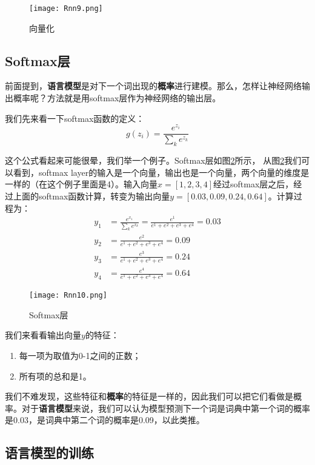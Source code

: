 \begin{figure}[!h]
	\centering
	\texttt{[image: Rnn9.png]}
	\caption{向量化}
	\label{fig:Rnn9}
\end{figure}

\subsection{Softmax层}\label{Rnn:11}

前面提到，\textbf{语言模型}是对下一个词出现的\textbf{概率}进行建模。那么，怎样让神经网络输出概率呢？方法就是用softmax层作为神经网络的输出层。

我们先来看一下softmax函数的定义：
\[
	g(z_i)=\frac{e^{z_i}}{\sum_{k}e^{z_k}}
\]

这个公式看起来可能很晕，我们举一个例子。Softmax层如图\ref{fig:Rnn10}所示，
从图\ref{fig:Rnn10}我们可以看到，softmax layer的输入是一个向量，输出也是一个向量，两个向量的维度是一样的（在这个例子里面是4）。输入向量$x=[1, 2, 3, 4]$经过softmax层之后，经过上面的softmax函数计算，转变为输出向量$y=[0.03, 0.09, 0.24, 0.64]$。计算过程为：
\begin{align*}
	y_1 & =\frac{e^{x_1}}{\sum_{k}e^{x_k}}=\frac{e^1}{e^1+e^2+e^3+e^4}=0.03 \\
	y_2 & =\frac{e^2}{e^1+e^2+e^3+e^4}=0.09                                 \\
	y_3 & =\frac{e^3}{e^1+e^2+e^3+e^4}=0.24                                 \\
	y_4 & =\frac{e^4}{e^1+e^2+e^3+e^4}=0.64
\end{align*}

\begin{figure}[!h]
	\centering
	\texttt{[image: Rnn10.png]}
	\caption{Softmax层}
	\label{fig:Rnn10}
\end{figure}

我们来看看输出向量$y$的特征：

\begin{enumerate}
	\item
	      每一项为取值为0-1之间的正数；
	\item
	      所有项的总和是1。
\end{enumerate}

我们不难发现，这些特征和\textbf{概率}的特征是一样的，因此我们可以把它们看做是概率。对于\textbf{语言模型}来说，我们可以认为模型预测下一个词是词典中第一个词的概率是0.03，是词典中第二个词的概率是0.09，以此类推。

\subsection{语言模型的训练}\label{Rnn:12}

